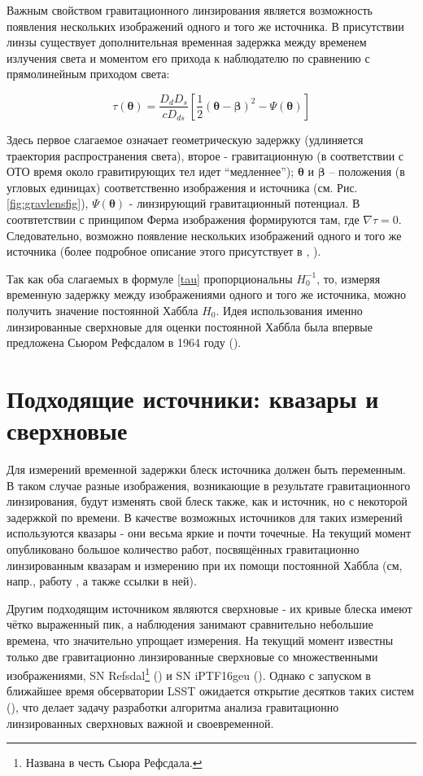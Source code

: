 Важным свойством гравитационного линзирования является возможность появления нескольких изображений одного и того же источника. В присутствии линзы существует дополнительная временная задержка между временем излучения света и моментом его прихода к наблюдателю по сравнению с прямолинейным приходом света:

\begin{equation}\label{tau}
\tau(\boldsymbol{\theta})=\frac{D_{d} D_{s}}{c D_{d s}}\left[\frac{1}{2}(\boldsymbol{\theta}-\boldsymbol{\beta})^{2}-\Psi(\boldsymbol{\theta})\right]
\end{equation}

Здесь первое слагаемое означает геометрическую задержку (удлиняется траектория распространения света), второе - гравитационную (в соответствии с ОТО время около гравитирующих тел идет “медленнее”); $\boldsymbol{\theta}$ и $\boldsymbol{\beta}$ -- положения (в угловых единицах) соответственно изображения и источника (см. Рис.\ref{fig:gravlensfig}), $\Psi(\boldsymbol{\theta})$ - линзирующий гравитационный потенциал. В соотвтетствии с принципом Ферма изображения формируются там, где $\nabla \tau = 0$. Следовательно, возможно появление нескольких изображений одного и того же источника (более подробное описание этого присутствует в \cite{gravlensbook}, \cite{gl_all}).

Так как оба слагаемых в формуле \eqref{tau} пропорциональны $H_0^{-1}$, то, измеряя временную задержку между изображениями одного и того же источника, можно получить значение постоянной Хаббла $H_0$. Идея использования именно линзированные сверхновые для оценки постоянной Хаббла была впервые предложена Сьюром Рефсдалом в 1964 году (\cite{refsdal1964}).

\section{Подходящие источники: квазары и сверхновые}

Для измерений временной задержки блеск источника должен быть переменным. В таком случае разные изображения, возникающие в результате гравитационного линзирования, будут изменять свой блеск также, как и источник, но с некоторой задержкой по времени. В качестве возможных источников для таких измерений используются квазары - они весьма яркие и почти точечные. На текущий момент опубликовано большое количество работ, посвящённых гравитационно линзированным квазарам и измерению при их помощи постоянной Хаббла (см, напр., работу \cite{holicow}, а также ссылки в ней). 

Другим подходящим источником являются сверхновые - их кривые блеска имеют чётко выраженный пик, а наблюдения занимают сравнительно небольшие времена, что значительно упрощает измерения. На текущий момент известны только две гравитационно линзированные сверхновые со множественными изображениями, SN Refsdal\footnote{Названа в честь Сьюра Рефсдала.} (\cite{kelly2014}) и SN iPTF16geu (\cite{goobar2017}). Однако с запуском в ближайшее время обсерватории LSST ожидается открытие десятков таких систем (\cite{pierelrodney2019}), что делает задачу разработки алгоритма анализа гравитационно линзированных сверхновых важной и своевременной.

